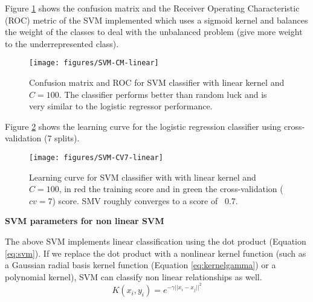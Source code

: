 \documentclass[11pt]{article}
\theoremstyle{definition}
\theoremstyle{remark}
\begin{document}
Figure \ref{fig:svm-cm} shows the confusion matrix and the Receiver Operating Characteristic (ROC) metric of the SVM implemented which uses a sigmoid kernel and balances the weight of the classes to deal with the unbalanced problem (give more weight to the underrepresented class).
\begin{figure}[H]
        \centering
        \texttt{[image: figures/SVM-CM-linear]}
        \caption{Confusion matrix and ROC for SVM classifier with linear kernel and $C=100$. The classifier performs better than random luck and is very similar to the logistic regressor performance.} \label{fig:svm-cm}
\end{figure}

Figure \ref{fig:svm-cv7} shows the learning curve for the logistic regression classifier using cross-validation (7 splits).
\begin{figure}[H]
        \centering
        \texttt{[image: figures/SVM-CV7-linear]}
        \caption{Learning curve for SVM classifier with with linear kernel and $C=100$, in red the training score and in green the cross-validation ($cv=7$) score. SMV roughly converges to a score of ~0.7.
        } \label{fig:svm-cv7}
\end{figure}

\textbf{SVM parameters for non linear SVM}

The above SVM implements linear classification using the dot product (Equation \ref{eq:svm}). If we replace the dot product with a nonlinear kernel function (such as a Gaussian radial basis kernel function (Equation \ref{eq:kernelgamma}) or a polynomial kernel), SVM can classify non linear relationships as well.
\begin{equation} \label{eq:kernelgamma}
K(x_i,y_i) = e^{-\gamma ||x_i-x_j||^2}
\end{equation}
\end{document}
